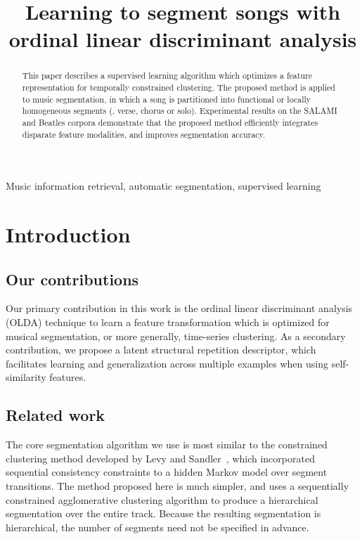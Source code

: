 \documentclass{article}
\title{Learning to segment songs with ordinal linear discriminant analysis}
\begin{document}
%
\maketitle
%
\begin{abstract}
This paper describes a supervised learning algorithm which optimizes a feature representation for temporally constrained clustering. 
The proposed method is applied to music segmentation, in which a song is partitioned into functional or
locally homogeneous segments (\eg, verse, chorus or solo).  Experimental results on the SALAMI and Beatles corpora demonstrate
that the proposed method efficiently integrates disparate feature modalities, and improves segmentation accuracy.
\end{abstract}
%
\begin{keywords}
Music information retrieval, automatic segmentation, supervised learning
\end{keywords}
%
\section{Introduction}
\label{sec:intro}


\subsection{Our contributions}
Our primary contribution in this work is the ordinal linear discriminant analysis (OLDA) technique to learn a 
feature transformation which is optimized for musical segmentation, or more generally, time-series clustering.
As a secondary contribution, we propose a latent structural repetition descriptor, which facilitates learning and
generalization across multiple examples when using self-similarity features.

\subsection{Related work}
\label{sec:related}

The core segmentation algorithm we use is most similar to the constrained clustering method developed by Levy and
Sandler~\cite{levy2008structural}, which incorporated sequential consistency constraints to a hidden Markov model over
segment transitions. The method proposed here is much simpler, and uses a sequentially constrained agglomerative
clustering algorithm to produce a hierarchical segmentation over the entire track.  Because the
resulting segmentation is hierarchical, the number of segments need not be specified in advance.
\end{document}
